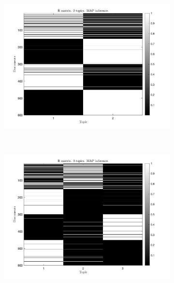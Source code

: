 \documentclass[12pt]{article}
\begin{document}
\begin{figure}[hb]
	\centering
	\begin{subfigure}{0.4\textwidth}
		\includegraphics[width=\textwidth]{images/MAP/R_map_2_topics.jpg}
		\caption{}
		\label{fig:R_MAP_2}
	\end{subfigure}
	~
	\begin{subfigure}{0.4\textwidth}
		\includegraphics[width=\textwidth]{images/MAP/R_map_3_topics.jpg}
		\caption{}
		\label{fig:R_MAP_3}
	\end{subfigure}
	~	
	\begin{subfigure}{0.4\textwidth}

\end{subfigure}
\end{figure}
\end{document}
